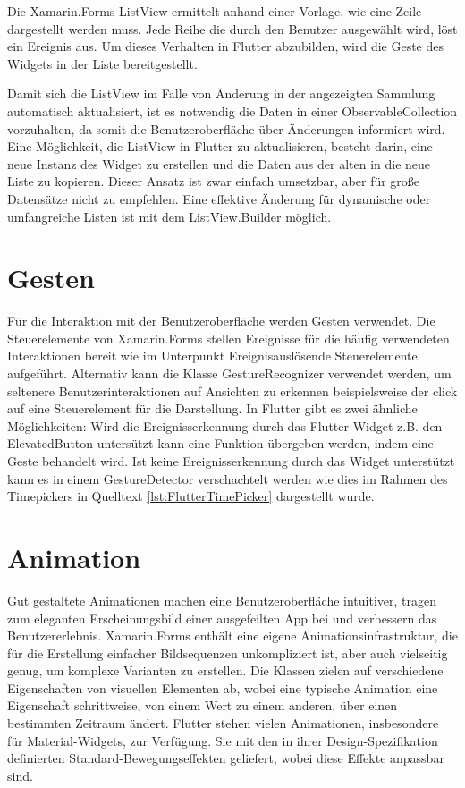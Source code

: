 Die Xamarin.Forms \glq ListView \grq{}ermittelt anhand einer Vorlage,  wie eine Zeile dargestellt werden muss.  Jede Reihe die durch den Benutzer ausgewählt wird,  löst ein Ereignis aus.  Um dieses Verhalten in Flutter abzubilden,  wird die Geste des Widgets in der Liste bereitgestellt.  

Damit sich die ListView im Falle von Änderung in der angezeigten Sammlung automatisch aktualisiert, ist es notwendig die Daten in einer \glq ObservableCollection\grq{} vorzuhalten,  da somit die Benutzeroberfläche über Änderungen informiert wird.   Eine  Möglichkeit, die  \glq ListView\grq{} in Flutter zu aktualisieren, besteht darin, eine neue Instanz des Widget zu erstellen und die Daten aus der alten in die neue Liste zu kopieren.  Dieser Ansatz ist zwar einfach umsetzbar, aber für große Datensätze nicht zu empfehlen.  Eine effektive Änderung für dynamische oder umfangreiche Listen ist mit dem ListView.Builder möglich.   

\section{Gesten}
Für die Interaktion mit der Benutzeroberfläche werden Gesten verwendet.  Die Steuerelemente von Xamarin.Forms stellen Ereignisse für die häufig verwendeten Interaktionen bereit wie im Unterpunkt Ereignisauslösende Steuerelemente aufgeführt.  Alternativ kann die Klasse  \glq GestureRecognizer\grq{}  verwendet werden, um seltenere Benutzerinteraktionen auf Ansichten zu erkennen beispielsweise der click auf eine Steuerelement für die Darstellung.   
In Flutter gibt es zwei ähnliche Möglichkeiten: Wird die Ereignisserkennung durch das Flutter-Widget z.B. den \glq ElevatedButton\grq{} untersützt kann eine Funktion übergeben werden, indem eine Geste behandelt wird.  Ist keine Ereignisserkennung durch das Widget unterstützt kann es in einem \glq GestureDetector\grq{} verschachtelt werden wie dies im Rahmen des  \glq Timepickers\grq{} in Quelltext \ref{lst:FlutterTimePicker} dargestellt wurde.

\section{Animation}
Gut gestaltete Animationen machen eine Benutzeroberfläche intuitiver, tragen zum eleganten Erscheinungsbild einer ausgefeilten App bei und verbessern das Benutzererlebnis.  
Xamarin.Forms enthält eine eigene Animationsinfrastruktur, die für die Erstellung einfacher Bildsequenzen unkompliziert ist, aber auch vielseitig genug, um komplexe Varianten zu erstellen.  Die Klassen zielen auf verschiedene Eigenschaften von visuellen Elementen ab, wobei eine typische Animation eine Eigenschaft schrittweise, von einem Wert zu einem anderen, über einen bestimmten Zeitraum ändert. 
Flutter stehen vielen Animationen,  insbesondere für Material-Widgets, zur Verfügung.  Sie mit den in ihrer Design-Spezifikation definierten Standard-Bewegungseffekten geliefert,  wobei diese Effekte anpassbar sind.


